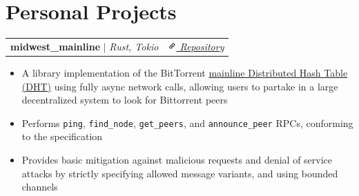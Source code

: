 \documentclass[letterpaper, 10pt]{report}
\makeatletter
\newcommand{\resumeProjectHeading}[2]{
    \begin{tabular*}{\textwidth}{l@{\extracolsep{\fill}}r}
        \small#1 & #2 \\
    \end{tabular*}\vspace{-1.5em}
}
\newenvironment{ResumeItem}{
    \vspace{-0.3em}
    \begin{itemize}
        \setlength\itemsep{-0.3em}
        }{
    \end{itemize}\vspace{-0.3em}}
\newcommand{\cxx}{C\nolinebreak\hspace{-.05em}\raisebox{0.03ex}{\bf +}\nolinebreak\hspace{-.05em}\raisebox{.03ex}{\bf +}}
\makeatother
\begin{document}
    \section{Personal Projects}
    \resumeProjectHeading
    {\textbf{midwest\_mainline} \(|\) \emph{Rust, Tokio}}{\href{https://github.com/Internal-Compiler-Error/midwest_mainline}{\textit{{\includegraphics[height=9pt, trim=0 5cm 0 -1.5cm]{link-icon} Repository}}}}

    \begin{ResumeItem}
        \item{A library implementation of the BitTorrent \href{https://www.bittorrent.org/beps/bep_0005.html}{mainline Distributed Hash Table (DHT)} using fully async network calls, allowing users to partake in a large decentralized system to look for Bittorrent peers}
        \item{Performs \texttt{ping}, \texttt{find\_node}, \texttt{get\_peers}, and \texttt{announce\_peer} RPCs, conforming to the specification}
        \item{Provides basic mitigation against malicious requests and denial of service attacks by strictly specifying allowed message variants, and using bounded channels}
    \end{ResumeItem}

\end{document}
